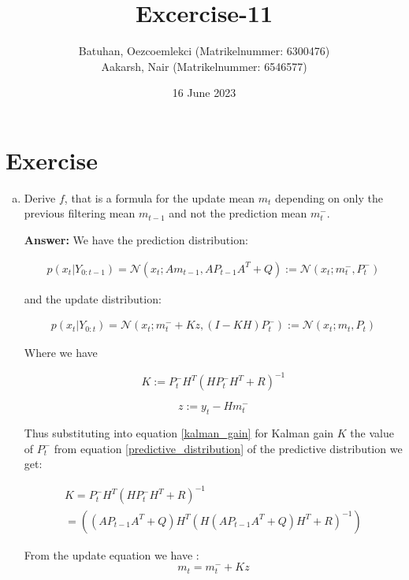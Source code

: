 \documentclass{tufte-handout}
\title{Excercise-11}
\author{Batuhan, Oezcoemlekci (Matrikelnummer: 6300476) \\
        Aakarsh, Nair (Matrikelnummer: 6546577)}
\date{16 June 2023}
\begin{document}
\maketitle%

\section{Exercise}

\begin{enumerate}[(a)]
    \item Derive $f$, that is a formula for the update mean $m_t$ depending on only the previous filtering mean $m_{t-1}$ and not the prediction mean $m_t^{-}$.

    \textbf{Answer:}
    We have the prediction distribution: 
    
\begin{multline}
   p(x_t | Y_{0:t-1}) = \mathcal{N}(x_t; Am_{t-1}, AP_{t-1}A^T + Q) := \mathcal{N}(x_t; m_t^{-}, P_t^{-})
   \label{predictive_distribution}
\end{multline} 

and the update distribution: 

\begin{multline}
    p(x_t | Y_{0:t}) = \mathcal{N}(x_t; m_t^{-} + Kz, (I - KH) P^{-}_t) := \mathcal{N}(x_t; m_t, P_t)
\end{multline}

Where we have 

\begin{equation}
    K:= P_t^{-} H^T (HP_t^{-}H^T + R)^{-1}
    \label{kalman_gain}
\end{equation}


\begin{equation}
    z := y_t - H m^{-}_t
\end{equation}

Thus substituting into equation \ref{kalman_gain} for Kalman gain $K$ the value of  $P_t^{-}$ from equation \ref{predictive_distribution} of the predictive distribution we get:

\begin{multline}
    K= P_t^{-} H^T (HP_t^{-}H^T + R)^{-1}  \\ 
     = \left((AP_{t-1} A^T + Q) H^T ( H (AP_{t-1}A^T + Q) H^T + R)^{-1} \right)
\end{multline}

From the update equation we have :
\begin{equation}
    m_t = m^{-}_t + Kz
\end{equation}


\end{enumerate}
\end{document}
